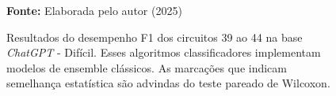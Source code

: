 \begin{figure}
\caption{Resultados do desempenho F1 dos circuitos 39 ao 44 na base \textit{ChatGPT} - Difícil. Esses algoritmos classificadores implementam modelos de ensemble clássicos. As marcações que indicam semelhança estatística são advindas do teste pareado de Wilcoxon.}
\label{fig:f1:hard:g8}
     \centering
    \centering

      \par\medskip\ABNTEXfontereduzida\selectfont\textbf{Fonte:} Elaborada pelo autor (2025) \par\medskip
\end{figure}